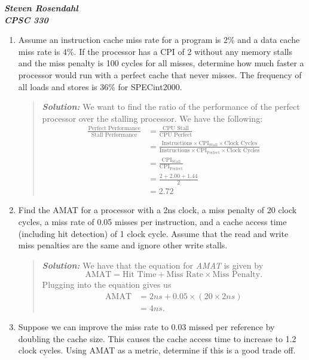 \documentclass{article}
\newcommand{\SLN}{\textit{\textbf{Solution: }}}
\begin{document}
\noindent \textit{\textbf{Steven Rosendahl\\CPSC 330}}
\vspace{2cm}
\begin{enumerate}
\item Assume an instruction cache miss rate for a program is 2\% and a data cache miss rate is 4\%. 
If the processor has a CPI of 2 without any memory stalls and the miss penalty is 100 cycles for all misses, 
determine how much faster a processor would run with a perfect cache that never misses. 
The frequency of all loads and stores is 36\% for SPECint2000.
\begin{quote}
\indent \SLN We want to find the ratio of the performance of the perfect processor over the stalling processor.
We have the following:
\begin{align*}
\frac{\text{Perfect Performance}}{\text{Stall Performance}} &= \frac{\text{CPU Stall}}{\text{CPU Perfect}}\\
&= \frac{\text{Instructions} \times \text{CPI}_{\text{Stall}} \times \text{Clock Cycles}}
{\text{Instructions} \times \text{CPI}_{\text{Perfect}} \times \text{Clock Cycles}}\\ 
&= \frac{\text{CPI}_{\text{Stall}}}{\text{CPI}_{\text{Perfect}}}\\
&= \frac{2 + 2.00 + 1.44}{2}\\
&= 2.72
\end{align*}
\end{quote}
\item Find the AMAT for a processor with a 2ns clock, 
a miss penalty of 20 clock cycles, 
a miss rate of 0.05 misses per instruction, 
and a cache access time (including hit detection) of 1 clock cycle.
Assume that the read and write miss penalties are the same and ignore other write stalls.
\begin{quote}
\indent \SLN We have that the equation for \textit{AMAT} is given by
\[
\text{AMAT} = \text{Hit Time} + \text{Miss Rate} \times \text{Miss Penalty}.
\]
Plugging into the equation gives us
\begin{align*}
\text{AMAT} &= 2ns + 0.05 \times (20 \times 2ns)\\
&= 4ns.
\end{align*}
\end{quote}
\item Suppose we can improve the miss rate to 0.03 missed per reference by doubling the cache size. 
This causes the cache access time to increase to 1.2 clock cycles.
Using AMAT as a metric, determine if this is a good trade off.

\end{enumerate}
\end{document}
